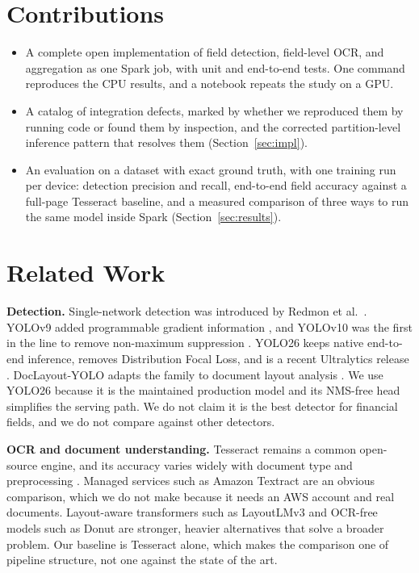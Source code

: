 \section{Contributions}
\begin{itemize}
\item A complete open implementation of field detection, field-level OCR, and aggregation as one Spark job, with unit and end-to-end tests. One command reproduces the CPU results, and a notebook repeats the study on a GPU.
\item A catalog of integration defects, marked by whether we reproduced them by running code or found them by inspection, and the corrected partition-level inference pattern that resolves them (Section~\ref{sec:impl}).
\item An evaluation on a dataset with exact ground truth, with one training run per device: detection precision and recall, end-to-end field accuracy against a full-page Tesseract baseline, and a measured comparison of three ways to run the same model inside Spark (Section~\ref{sec:results}).
\end{itemize}

\section{Related Work}
\textbf{Detection.} Single-network detection was introduced by Redmon et al.\ \cite{redmon2016}. YOLOv9 added programmable gradient information \cite{wang2024yolov9}, and YOLOv10 was the first in the line to remove non-maximum suppression \cite{wang2024yolov10}. YOLO26 keeps native end-to-end inference, removes Distribution Focal Loss, and is a recent Ultralytics release \cite{jocher2026yolo26}. DocLayout-YOLO adapts the family to document layout analysis \cite{zhao2024doclayout}. We use YOLO26 because it is the maintained production model and its NMS-free head simplifies the serving path. We do not claim it is the best detector for financial fields, and we do not compare against other detectors.

\textbf{OCR and document understanding.} Tesseract \cite{smith2007} remains a common open-source engine, and its accuracy varies widely with document type and preprocessing \cite{thammarak2022,reisswig2019}. Managed services such as Amazon Textract \cite{textract} are an obvious comparison, which we do not make because it needs an AWS account and real documents. Layout-aware transformers such as LayoutLMv3 \cite{huang2022layoutlmv3} and OCR-free models such as Donut \cite{kim2022donut} are stronger, heavier alternatives that solve a broader problem. Our baseline is Tesseract alone, which makes the comparison one of pipeline structure, not one against the state of the art.

